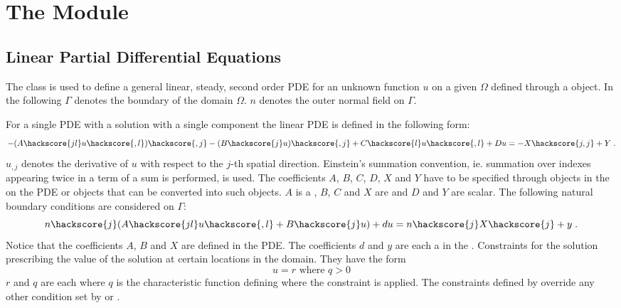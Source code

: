 
%
%
%


\chapter{The Module \linearPDEs}



\section{Linear Partial Differential Equations}
\label{SEC LinearPDE}

The \LinearPDE class is used to define a general linear, steady, second order PDE
for an unknown function $u$ on a given $\Omega$ defined through a \Domain object.
In the following $\Gamma$ denotes the boundary of the domain $\Omega$. $n$ denotes
the outer normal field on $\Gamma$.

For a single PDE with a solution with a single component the linear PDE is defined in the
following form:
\begin{equation}\label{LINEARPDE.SINGLE.1}
-(A\hackscore{jl} u\hackscore{,l})\hackscore{,j}-(B\hackscore{j} u)\hackscore{,j}+C\hackscore{l} u\hackscore{,l}+D u =-X\hackscore{j,j}+Y \; .
\end{equation}
$u_{,j}$ denotes the derivative of $u$ with respect to the $j$-th spatial direction. Einstein's summation convention, ie. summation over indexes appearing twice in a term of a sum is performed, is used.
The coefficients $A$, $B$, $C$, $D$, $X$ and $Y$ have to be specified through \Data objects in the
\Function on the PDE or objects that can be converted into such \Data objects.
$A$ is a \RankTwo, $B$, $C$ and $X$ are \RankOne and $D$ and $Y$ are scalar.
The following natural
boundary conditions are considered  on $\Gamma$:
\begin{equation}\label{LINEARPDE.SINGLE.2}
n\hackscore{j}(A\hackscore{jl} u\hackscore{,l}+B\hackscore{j} u)+d u=n\hackscore{j}X\hackscore{j} + y  \;.
\end{equation}
Notice that the coefficients $A$, $B$ and $X$ are defined in the PDE. The coefficients $d$ and $y$ are
each a \Scalar in the \FunctionOnBoundary.  Constraints  for the solution prescribing the value of the
solution at certain locations in the domain. They have the form
\begin{equation}\label{LINEARPDE.SINGLE.3}
u=r \mbox{ where } q>0
\end{equation}
$r$ and $q$ are each \Scalar where $q$ is the characteristic function
 defining where the constraint is applied.
The constraints defined by  override any other condition set by 
or .

